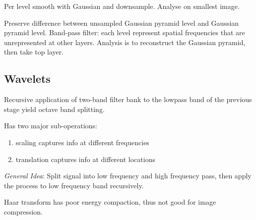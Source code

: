 \begin{definition}
  Per level smooth with Gaussian and downsample. Analyse on smallest image. 
\end{definition}

\begin{definition}
  Preserve difference between unsampled Gaussian pyramid level and Gaussian pyramid level.
  Band-pass filter: each level represent spatial frequencies that are unrepresented at other layers.
  Analysis is to reconstruct the Gaussian pyramid, then take top layer.
\end{definition}

\subsection{Wavelets}

\begin{definition}
  Recursive application of two-band filter bank to the lowpass band of the previous stage yield octave band splitting.
\end{definition}

\begin{algorithm}
  Has two major sub-operations:
  \begin{enumerate}
    \item scaling captures info at different frequencies
    \item translation captures info at different locations
  \end{enumerate}

  \textit{General Idea}: Split signal into low frequency and high frequency pass, then apply the process to low frequency band recursively.
\end{algorithm}

\begin{theorem}
  Haar transform has poor energy compaction, thus not good for image compression.
\end{theorem}
